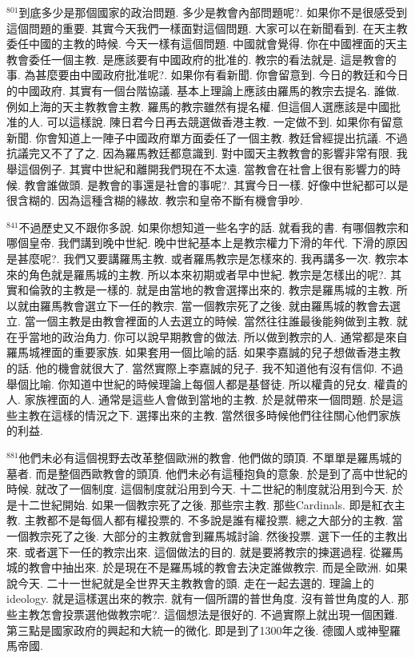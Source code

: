 \documentclass{book}
\begin{document}
$^{801}$到底多少是那個國家的政治問題.
多少是教會內部問題呢?.
如果你不是很感受到這個問題的重要.
其實今天我們一樣面對這個問題.
大家可以在新聞看到.
在天主教委任中國的主教的時候.
今天一樣有這個問題.
中國就會覺得.
你在中國裡面的天主教會委任一個主教.
是應該要有中國政府的批准的.
教宗的看法就是.
這是教會的事.
為甚麼要由中國政府批准呢?.
如果你有看新聞.
你會留意到.
今日的教廷和今日的中國政府.
其實有一個台階協議.
基本上理論上應該由羅馬的教宗去提名.
誰做.
例如上海的天主教教會主教.
羅馬的教宗雖然有提名權.
但這個人選應該是中國批准的人.
可以這樣說.
陳日君今日再去競選做香港主教.
一定做不到.
如果你有留意新聞.
你會知道上一陣子中國政府單方面委任了一個主教.
教廷曾經提出抗議.
不過抗議完又不了了之.
因為羅馬教廷都意識到.
對中國天主教教會的影響非常有限.
我舉這個例子.
其實中世紀和離開我們現在不太遠.
當教會在社會上很有影響力的時候.
教會誰做頭.
是教會的事還是社會的事呢?.
其實今日一樣.
好像中世紀都可以是很含糊的.
因為這種含糊的緣故.
教宗和皇帝不斷有機會爭吵.

$^{841}$不過歷史又不跟你多說.
如果你想知道一些名字的話.
就看我的書.
有哪個教宗和哪個皇帝.
我們講到晚中世紀.
晚中世紀基本上是教宗權力下滑的年代.
下滑的原因是甚麼呢?.
我們又要講羅馬主教.
或者羅馬教宗是怎樣來的.
我再講多一次.
教宗本來的角色就是羅馬城的主教.
所以本來初期或者早中世紀.
教宗是怎樣出的呢?.
其實和倫敦的主教是一樣的.
就是由當地的教會選擇出來的.
教宗是羅馬城的主教.
所以就由羅馬教會選立下一任的教宗.
當一個教宗死了之後.
就由羅馬城的教會去選立.
當一個主教是由教會裡面的人去選立的時候.
當然往往誰最後能夠做到主教.
就在乎當地的政治角力.
你可以說早期教會的做法.
所以做到教宗的人.
通常都是來自羅馬城裡面的重要家族.
如果套用一個比喻的話.
如果李嘉誠的兒子想做香港主教的話.
他的機會就很大了.
當然實際上李嘉誠的兒子.
我不知道他有沒有信仰.
不過舉個比喻.
你知道中世紀的時候理論上每個人都是基督徒.
所以權貴的兒女.
權貴的人.
家族裡面的人.
通常是這些人會做到當地的主教.
於是就帶來一個問題.
於是這些主教在這樣的情況之下.
選擇出來的主教.
當然很多時候他們往往關心他們家族的利益.

$^{881}$他們未必有這個視野去改革整個歐洲的教會.
他們做的頭頂.
不單單是羅馬城的墓者.
而是整個西歐教會的頭頂.
他們未必有這種抱負的意象.
於是到了高中世紀的時候.
就改了一個制度.
這個制度就沿用到今天.
十二世紀的制度就沿用到今天.
於是十二世紀開始.
如果一個教宗死了之後.
那些宗主教.
那些Cardinals.
即是紅衣主教.
主教都不是每個人都有權投票的.
不多說是誰有權投票.
總之大部分的主教.
當一個教宗死了之後.
大部分的主教就會到羅馬城討論.
然後投票.
選下一任的主教出來.
或者選下一任的教宗出來.
這個做法的目的.
就是要將教宗的揀選過程.
從羅馬城的教會中抽出來.
於是現在不是羅馬城的教會去決定誰做教宗.
而是全歐洲.
如果說今天.
二十一世紀就是全世界天主教教會的頭.
走在一起去選的.
理論上的ideology.
就是這樣選出來的教宗.
就有一個所謂的普世角度.
沒有普世角度的人.
那些主教怎會投票選他做教宗呢?.
這個想法是很好的.
不過實際上就出現一個困難.
第三點是國家政府的興起和大統一的微化.
即是到了1300年之後.
德國人或神聖羅馬帝國.
\end{document}
